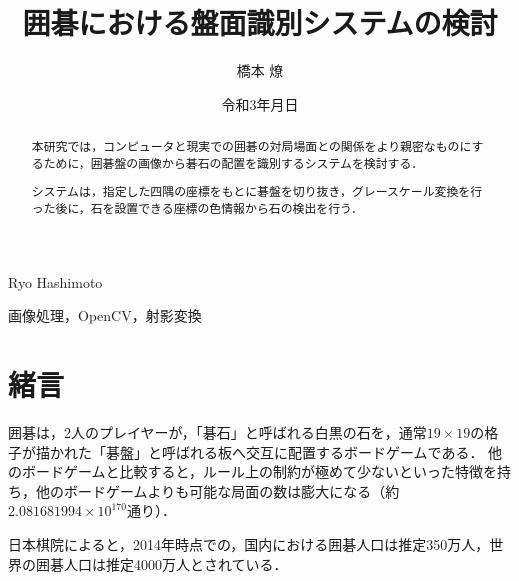 \documentclass[openright]{nitocs}
\numberwithin{equation}{section}
\begin{document}
    \title{囲碁における盤面識別システムの検討}  %
    \author{橋本 燎}{Ryo Hashimoto} %
    \date{令和3年\number\month 月\number\day 日} %

    \begin{abstract} %
        本研究では，コンピュータと現実での囲碁の対局場面との関係をより親密なものにするために，囲碁盤の画像から碁石の配置を識別するシステムを検討する．

        システムは，指定した四隅の座標をもとに碁盤を切り抜き，グレースケール変換を行った後に，石を設置できる座標の色情報から石の検出を行う．
    \end{abstract}

    \begin{keyword} %
        画像処理，OpenCV，射影変換
    \end{keyword}


    \maketitle

    \section{緒言}  
    \label{sec:format}
        囲碁は，2人のプレイヤーが，「碁石」と呼ばれる白黒の石を，通常$19\times19$の格子が描かれた「碁盤」と呼ばれる板へ交互に配置するボードゲームである．
        他のボードゲームと比較すると，ルール上の制約が極めて少ないといった特徴を持ち，他のボードゲームよりも可能な局面の数は膨大になる（約$2.081681994 \times 10^{170}$通り\cite{numbers}）．

        日本棋院によると，2014年時点での，国内における囲碁人口は推定350万人，世界の囲碁人口は推定4000万人とされている．
\end{document}
